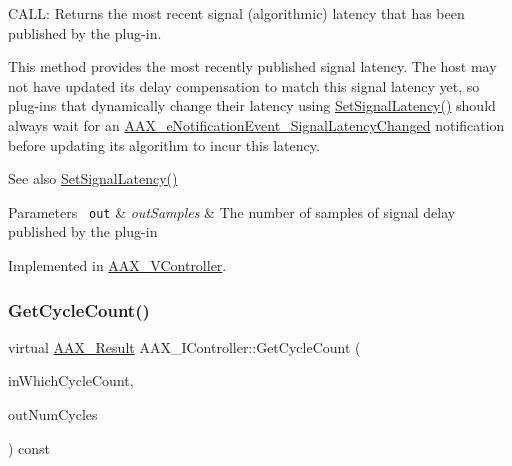 C\+A\+LL\+: Returns the most recent signal (algorithmic) latency that has been published by the plug-\/in. 

This method provides the most recently published signal latency. The host may not have updated its delay compensation to match this signal latency yet, so plug-\/ins that dynamically change their latency using \mbox{\hyperlink{a01789_af2c648879419d94971c1308d8698601f}{Set\+Signal\+Latency()}} should always wait for an \mbox{\hyperlink{a00491_afab5ea2cfd731fc8f163b6caa685406ea06ab4b075ecb523d0dde3ec19b76a756}{A\+A\+X\+\_\+e\+Notification\+Event\+\_\+\+Signal\+Latency\+Changed}} notification before updating its algorithm to incur this latency.

\begin{DoxySeeAlso}{See also}
\mbox{\hyperlink{a01789_af2c648879419d94971c1308d8698601f}{Set\+Signal\+Latency()}}
\end{DoxySeeAlso}

\begin{DoxyParams}[1]{Parameters}
\mbox{\texttt{ out}}  & {\em out\+Samples} & The number of samples of signal delay published by the plug-\/in \\
\hline
\end{DoxyParams}


Implemented in \mbox{\hyperlink{a01905_ab73ab5f51350ae61a73542231948c81c}{A\+A\+X\+\_\+\+V\+Controller}}.

\mbox{\label{a01789_a26e009667f9cd6c3cccd45b862108bf4}} 
\subsubsection{\texorpdfstring{GetCycleCount()}{GetCycleCount()}}
{\footnotesize\ttfamily virtual \mbox{\hyperlink{a00392_a4d8f69a697df7f70c3a8e9b8ee130d2f}{A\+A\+X\+\_\+\+Result}} A\+A\+X\+\_\+\+I\+Controller\+::\+Get\+Cycle\+Count (\begin{DoxyParamCaption}\item[{\mbox{\hyperlink{a00662_a13e384f22825afd3db6d68395b79ce0d}{A\+A\+X\+\_\+\+E\+Property}}}]{in\+Which\+Cycle\+Count,  }\item[{\mbox{\hyperlink{a00392_ab247c0d8686c14e05cbb567ef276f249}{A\+A\+X\+\_\+\+C\+Property\+Value}} $\ast$}]{out\+Num\+Cycles }\end{DoxyParamCaption}) const\hspace{0.3cm}{\ttfamily [pure virtual]}}



